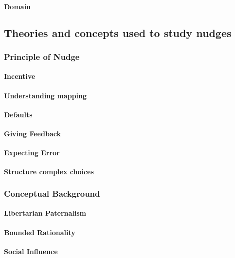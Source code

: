 \paragraph{Domain}


\subsection{Theories and concepts used to study nudges}

\subsubsection{Principle of Nudge}
\paragraph{Incentive}
\paragraph{Understanding mapping}
\paragraph{Defaults}
\paragraph{Giving Feedback}
\paragraph{Expecting Error}
\paragraph{Structure complex choices}

\subsubsection{Conceptual Background}
\paragraph{Libertarian Paternalism}
\paragraph{Bounded Rationality}
\paragraph{Social Influence}
